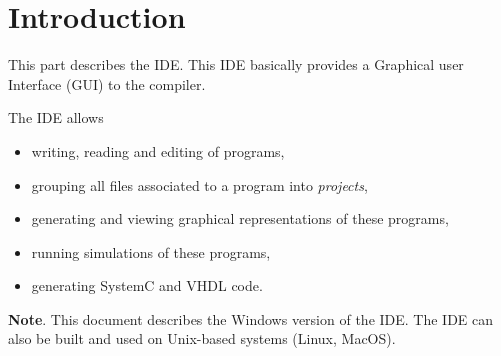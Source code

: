 
\chapter*{Introduction}
\label{sec:ide-intro}

This part describes the \caph IDE. This IDE basically provides a Graphical user Interface (GUI) to
the \caphc compiler.

\medskip
The \caph IDE allows
\begin{itemize}
\item writing, reading and editing of \caph programs, %
\item grouping all files associated to a \caph program into \emph{projects},
\item generating and viewing graphical representations of these programs,
\item running simulations of these programs,
\item generating SystemC and VHDL code.
\end{itemize}

\medskip
\textbf{Note}. This document describes the Windows version of the \caph IDE. The IDE can also be built and used on
Unix-based systems (Linux, MacOS).

